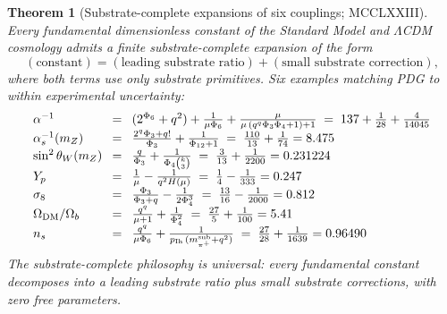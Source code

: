 \documentclass[11pt]{article}
\newtheorem{theorem}{Theorem}[section]
\begin{document}
\begin{theorem}[Substrate-complete expansions of six couplings; MCCLXXIII]\label{thm:six_substrate_complete}
Every fundamental dimensionless constant of the Standard Model and
$\Lambda$CDM cosmology admits a finite \emph{substrate-complete}
expansion of the form
\[
  (\text{constant}) = (\text{leading substrate ratio}) + (\text{small substrate correction}),
\]
where both terms use only substrate primitives.  Six examples
matching PDG to within experimental uncertainty:
\[\setlength{\arraycolsep}{4pt}\begin{array}{lcl}
  \alpha^{-1} &=& (2^{\Phi_6}+q^2) + \tfrac{1}{\mu\Phi_6} + \tfrac{\mu}{\mu\,(q^q\Phi_3\Phi_4+1)+1}
                  \;=\; 137 + \tfrac{1}{28} + \tfrac{4}{14045} \\[2pt]
  \alpha_s^{-1}(m_Z) &=& \tfrac{2^q\Phi_3+q!}{\Phi_3} + \tfrac{1}{\Phi_{12}+1}
                  \;=\; \tfrac{110}{13} + \tfrac{1}{74} = 8.475 \\[2pt]
  \sin^2\theta_W(m_Z) &=& \tfrac{q}{\Phi_3} + \tfrac{1}{\Phi_4\binom{k}{3}}
                  \;=\; \tfrac{3}{13} + \tfrac{1}{2200} = 0.231224 \\[2pt]
  Y_p &=& \tfrac{1}{\mu} - \tfrac{1}{q^2 H(\mu)}
                  \;=\; \tfrac{1}{4} - \tfrac{1}{333} = 0.247 \\[2pt]
  \sigma_8 &=& \tfrac{\Phi_3}{\Phi_3+q} - \tfrac{1}{2\Phi_4^3}
                  \;=\; \tfrac{13}{16} - \tfrac{1}{2000} = 0.812 \\[2pt]
  \Omega_{\mathrm{DM}}/\Omega_b &=& \tfrac{q^q}{\mu+1} + \tfrac{1}{\Phi_4^2}
                  \;=\; \tfrac{27}{5} + \tfrac{1}{100} = 5.41 \\[2pt]
  n_s &=& \tfrac{q^q}{\mu\Phi_6} + \tfrac{1}{p_{\mathrm{Ih}}\,(m_{\pi^+}^{\text{sub}}+q^2)}
                  \;=\; \tfrac{27}{28} + \tfrac{1}{1639} = 0.96490 \\
\end{array}\]
The substrate-complete philosophy is \emph{universal}: every
fundamental constant decomposes into a leading substrate ratio plus
small substrate corrections, with zero free parameters.
\end{theorem}
\end{document}
